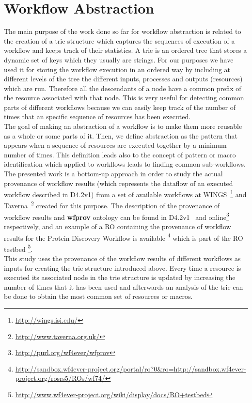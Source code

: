\section{Workflow Abstraction}

\label{sec:abstraction}
The main purpose of the work done so far for workflow abstraction is related to the creation of a trie structure which captures the sequences of execution of a workflow and keeps track of their statistics. A trie is an ordered tree that stores a dynamic set of keys which they usually are strings. For our purposes we have used it for storing the workflow execution in an ordered way by including at different levels of the tree the different inputs, processes and outputs (resources) which are run. Therefore all the descendants of a node have a common prefix of the resource associated with that node. This is very useful for detecting common parts of different workflows because we can easily keep track of the number of times that an specific sequence of resources has been executed. \\

The goal of making an abstraction of a workflow is to make them more reusable as a whole or some parts of it. Then, we define abstraction as the pattern that appears when a sequence of resources are executed together by a minimum number of times. This definition leads also to the concept of pattern or macro identification which applied to workflows leads to finding common sub-workflows. \\ 

The presented work is a bottom-up approach in order to study the actual provenance of workflow results (which represents the dataflow of an executed workflow described in D4.2v1) from a set of available workflows at WINGS~\footnote{\url{http://wings.isi.edu/}} and Taverna~\footnote{\url{http://www.taverna.org.uk/}} created for this purpose. The description of the provenance of workflow results and \textbf{wfprov} ontology can be found in D4.2v1~\cite{D4.2v1} and online\footnote{\url{http://purl.org/wf4ever/wfprov}} respectively, and an example of a RO containing the provenance of workflow results for the Protein Discovery Workflow is available \footnote{\url{http://sandbox.wf4ever-project.org/portal/ro?0&ro=http://sandbox.wf4ever-project.org/rosrs5/ROs/wf74/}} which is part of the RO testbed \footnote{\url{http://www.wf4ever-project.org/wiki/display/docs/RO+testbed}}. \\


This study uses the provenance of the workflow results of different workflows as inputs for creating the trie structure introduced above. Every time a resource is executed its associated node in the trie structure is updated by increasing the number of times that it has been used and afterwards an analysis of the trie can be done to obtain the most common set of resources or macros. \\
 


